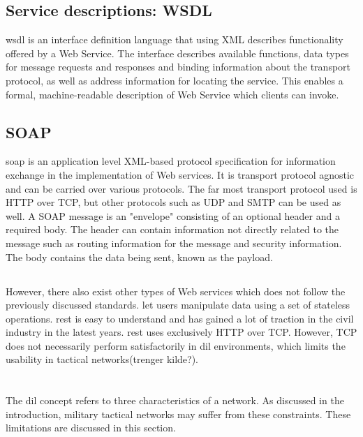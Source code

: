 \documentclass[USenglish]{ifimaster}
\begin{document}
\subsection{Service descriptions: WSDL}

\gls{wsdl} is an interface definition language that using XML describes
functionality offered by a Web Service. The interface describes available
functions, data types for message requests and responses and binding information
about the transport protocol, as well as address information for locating the
service. This enables a formal, machine-readable description of Web Service
which clients can invoke.


\subsection{SOAP}

\gls{soap} is an application level XML-based protocol specification for
information exchange in the implementation of Web services. It is transport
protocol agnostic and can be carried over various protocols. The far most
transport protocol used is HTTP over TCP, but other protocols such as UDP and
SMTP can be used as well. A SOAP message is an "envelope" consisting of an
optional header and a required body. The header can contain information not
directly related to the message such as routing information for the message and
security information. The body contains the data being sent, known as the
payload.

\subsection{}
\label{rest}
However, there also exist other types of Web services which does not follow the
previously discussed standards.  let users manipulate data
using a set of stateless operations. \gls{rest} is easy to understand and has
gained a lot of traction in the civil industry in the latest years. \gls{rest}
uses exclusively HTTP over TCP. However, TCP does not necessarily perform
satisfactorily in \gls{dil} environments, which limits the usability in tactical
networks(trenger kilde?).

\section{}
\label{dil}
The \gls{dil} concept refers to three characteristics of a network. As discussed
in the introduction, military tactical networks may suffer from these
constraints. These limitations are discussed in this section.
\end{document}
